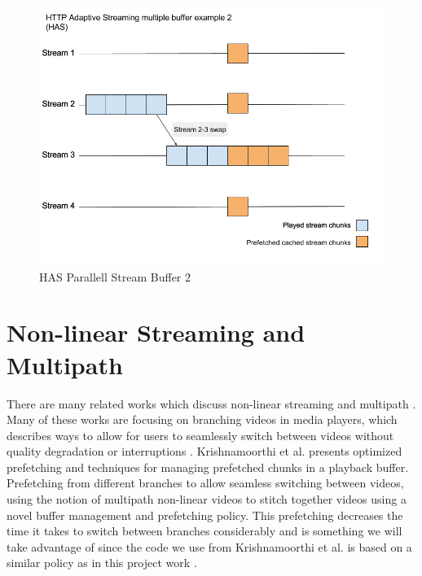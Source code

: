 \begin{figure}[!ht]
\begin{center}
\includegraphics[scale=0.4]{HAS2.png}
\caption{HAS Parallell Stream Buffer 2}
\label{fig:HAS2}
\end{center}
\end{figure}

\section{Non-linear Streaming and Multipath}
\label{sec:nonlinear}
There are many related works which discuss non-linear streaming and multipath \cite{optimizedbroadcast, hasmultipath, qualbranch, scalableOnDemand}. Many of these works are focusing on branching videos in media players, which describes ways to allow for users to seamlessly switch between videos without quality degradation or interruptions \cite{hasmultipath, qualbranch, scalableOnDemand}. Krishnamoorthi et al. \cite{hasmultipath} presents optimized prefetching and techniques for managing prefetched chunks in a playback buffer. Prefetching from different branches to allow seamless switching between videos, using the notion of multipath non-linear videos to stitch together videos using a novel buffer management and prefetching policy. This prefetching decreases the time it takes to switch between branches considerably and is something we will take advantage of since the code we use from Krishnamoorthi et al. \cite{qualbranch} is based on a similar policy as in this project work \cite{hasmultipath}. 

